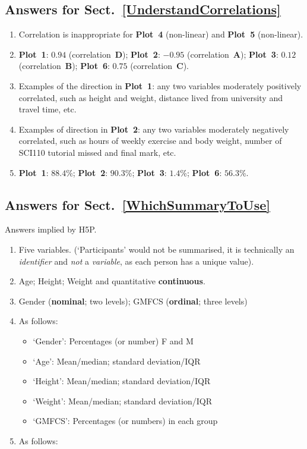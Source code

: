 \documentclass[
  11pt,
  a4paper,
  krantz2]{krantz}
\providecommand{\tightlist}{%
  \setlength{\itemsep}{0pt}\setlength{\parskip}{0pt}}
\begin{document}
\begin{footnotesize}
\subsection*{Answers for Sect.~\ref{UnderstandCorrelations}}\label{answers-for-sect.-refunderstandcorrelations}

\begin{enumerate}
\def\labelenumi{\arabic{enumi}.}
\tightlist
\item
  Correlation is inappropriate for \textbf{Plot~4} (non-linear) and \textbf{Plot~5} (non-linear).
\item
  \textbf{Plot~1}: \(0.94\) (correlation~\textbf{D});
  \textbf{Plot~2}: \(-0.95\) (correlation~\textbf{A});
  \textbf{Plot~3}: \(0.12\) (correlation~\textbf{B});
  \textbf{Plot~6}: \(0.75\) (correlation~\textbf{C}).
\item
  Examples of the direction in \textbf{Plot~1}: any two variables moderately positively correlated, such as height and weight, distance lived from university and travel time, etc.
\item
  Examples of direction in \textbf{Plot~2}: any two variables moderately negatively correlated, such as hours of weekly exercise and body weight, number of SCI110 tutorial missed and final mark, etc.
\item
  \textbf{Plot~1}: \(88.4\)\%;
  \textbf{Plot~2}: \(90.3\)\%;
  \textbf{Plot~3}: \(1.4\)\%;
  \textbf{Plot~6}: \(56.3\)\%.
\end{enumerate}

\subsection*{Answers for Sect.~\ref{WhichSummaryToUse}}\label{answers-for-sect.-refwhichsummarytouse}

Answers implied by H5P.

\begin{enumerate}
\def\labelenumi{\arabic{enumi}.}
\tightlist
\item
  Five variables. (`Participants' would not be summarised, it is technically an \emph{identifier} and \emph{not} a \emph{variable}, as each person has a unique value).
\item
  Age; Height; Weight and quantitative \textbf{continuous}.
\item
  Gender (\textbf{nominal}; two levels); GMFCS (\textbf{ordinal}; three levels)
\item
  As follows:

  \begin{itemize}
  \tightlist
  \item
    `Gender': Percentages (or number) F and M
  \item
    `Age': Mean/median; standard deviation/IQR
  \item
    `Height': Mean/median; standard deviation/IQR
  \item
    `Weight': Mean/median; standard deviation/IQR
  \item
    `GMFCS': Percentages (or numbers) in each group
  \end{itemize}
\item
  As follows:


\end{enumerate}
\end{footnotesize}
\end{document}
